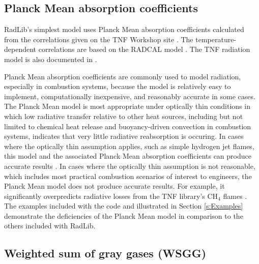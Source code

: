 \documentclass[preprint,12pt]{elsarticle}
\begin{document}

\subsection{Planck Mean absorption coefficients} \label{s:planckmean}

RadLib's simplest model uses Planck Mean absorption coefficients calculated from the correlations given on the TNF Workshop site \citep{Smith_2003}. The temperature-dependent correlations are based on the RADCAL model \citep{Grosshandler_1993}. The TNF radiation model is also documented in \citep{Barlow_2001}.

Planck Mean absorption coefficients are commonly used to model radiation, especially in combustion systems, because the model is relatively easy to implement, computationally inexpensive, and reasonably accurate in some cases. The Planck Mean model is most appropriate under optically thin conditions in which low radiative transfer relative to other heat sources, including but not limited to chemical heat release and buoyancy-driven convection in combustion systems, indicates that very little radiative reabsorption is occuring. In cases where the optically thin assumption applies, such as simple hydrogen jet flames, this model and the associated Planck Mean absorption coefficients can produce accurate results \citep{Barlow_1999}. In cases where the optically thin assumption is not reasonable, which includes most practical combustion scenarios of interest to engineers, the Planck Mean model does not produce accurate results. For example, it significantly overpredicts radiative losses from the TNF library's CH$_4$ flames \cite{Frank_2000,Zhu_2002,Coelho_2002}. The examples included with the code and illustrated in Section \ref{s:Examples} demonstrate the deficiencies of the Planck Mean model in comparison to the others included with RadLib.


\subsection{Weighted sum of gray gases (WSGG)} \label{s:wsgg}
\end{document}
